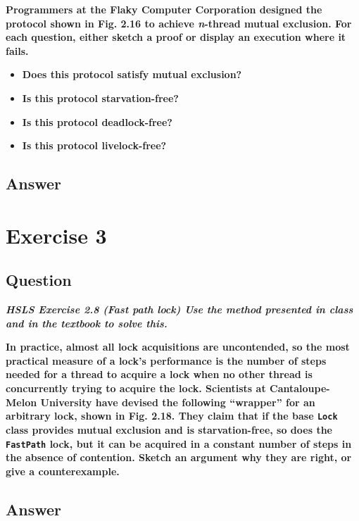 \documentclass{article}
\begin{document}
\textbf{Programmers at the Flaky Computer Corporation designed the protocol shown in Fig. 2.16 to achieve \textit{n}-thread mutual exclusion. For each question, either sketch a proof or display an execution where it fails.}

\begin{itemize}
    \item \textbf{Does this protocol satisfy mutual exclusion?}
    \item \textbf{Is this protocol starvation-free?}
    \item \textbf{Is this protocol deadlock-free?}
    \item \textbf{Is this protocol livelock-free?}
\end{itemize}

\subsection*{Answer}


\section*{Exercise 3}
\subsection*{Question}
\textbf{\textit{HSLS Exercise 2.8 (Fast path lock) Use the method presented in class and in the textbook to solve this.}}

\textbf{In practice, almost all lock acquisitions are uncontended, so the most practical measure of a lock’s performance is the number of steps needed for a thread to acquire a lock when no other thread is concurrently trying to acquire the lock. Scientists at Cantaloupe-Melon University have devised the following “wrapper” for an arbitrary lock, shown in Fig. 2.18. They claim that if the base \texttt{Lock} class provides mutual exclusion and is starvation-free, so does the \texttt{FastPath} lock, but it can be acquired in a constant number of steps in the absence of contention. Sketch an argument why they are right, or give a counterexample.}

\subsection*{Answer}

\newpage
\printbibliography
\end{document}

